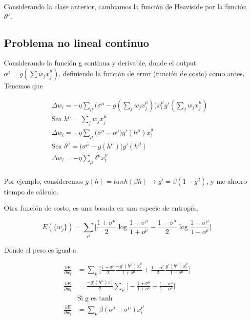 Considerando la clase anterior, cambiamos la función de Heaviside por la función $\delta ^\mu$.


\subsection{Problema no lineal continuo}

Considerando la función g continua y derivable, donde el output $o^\mu = g(\sum w_j x_j^\mu)$, definiendo la función de error (función de costo) como antes. Tenemos que

\begin{align}
    &\Delta w_l = -\eta \sum_\mu \bigg( \sigma ^ \mu - g(\sum_j w_jx_j^\mu)\bigg) x^\mu_l g'(\sum_j w_jx_j^\mu)\\
    &\text{Sea }h^\mu = \sum_j w_jx_j^\mu \\
    &\Delta w_l = -\eta \sum_\mu \bigg( \sigma ^ \mu - o^\mu\bigg) g'(h^\mu)  x^\mu_l\\
    &\text{Sea }\delta^\mu =  \bigg( \sigma ^ \mu - g(h^\mu)\bigg) g'(h^\mu)\\
    &\Delta w_l = -\eta \sum_\mu \delta^\mu  x^\mu_l\\
\end{align}

Por ejemplo, consideremos $g(h)=tanh(\beta h) \rightarrow g' = \beta (1-g^2)$, y me ahorro tiempo de cálculo.

Otra función de costo, es una basada en una especie de entropía, 

\begin{equation}
	E(\{ w_j \}) = \sum_\mu \bigg[  \frac{1+\sigma^\mu}{2} \log{\frac{1+\sigma^\mu}{1+o^\mu}} + \frac{1-\sigma^\mu}{2} \log{\frac{1-\sigma^\mu}{1-o^\mu}}  \bigg]
\end{equation}

Donde el peso es igual a 

\begin{align}
	\frac{\partial E}{\partial w_l} &=  \sum _\mu \bigg[  \frac{1+\sigma^\mu}{2} {\frac{-g'(h^\mu) x^\mu_l}{1+o^\mu}} + \frac{1-\sigma^\mu}{2} {\frac{g'(h^\mu) x^\mu_l}{1-o^\mu}}  \bigg]\\
	\frac{\partial E}{\partial w_l} &=  \frac{-g'(h^\mu) x^\mu_l}{2}\sum _\mu \bigg[  -\frac{1+\sigma^\mu}{1+o^\mu} + \frac{1-\sigma^\mu}{1-o^\mu} \bigg]\\
	&\text{Si g es tanh}\\
		\frac{\partial E}{\partial w_l} &= \sum_\mu \beta (o^\mu - \sigma^\mu) x_l^\mu
\end{align}



